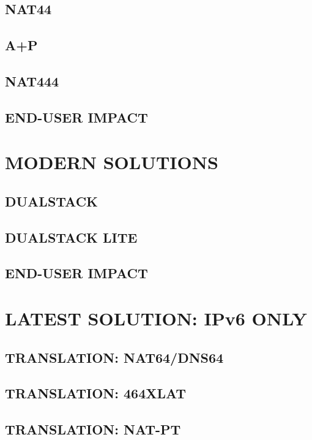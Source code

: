 \documentclass[format=sigconf, natbib=true, nonacm=true]{acmart}
\begin{document}
    \subsection{NAT44}
    \lipsum[12-15]
    \subsection{A+P}
    \lipsum[14-16]
    \subsection{NAT444}
    \lipsum[16-18]
    \subsection*{END-USER IMPACT}
    \lipsum[18-22]

    \section{MODERN SOLUTIONS}
    \lipsum[21]
    \subsection{DUALSTACK}
    \lipsum[22-25]
    \subsection{DUALSTACK LITE}
    \lipsum[25-28]
    \subsection*{END-USER IMPACT}
    \lipsum[18-22]

    \section{LATEST SOLUTION: IPv6 ONLY}
    \lipsum[21]
    \subsection{TRANSLATION: NAT64/DNS64}
    \lipsum[22-24]
    \subsection{TRANSLATION: 464XLAT}
    \lipsum[24-26]
    \subsection{TRANSLATION: NAT-PT}
    \lipsum[26-28]
\end{document}
